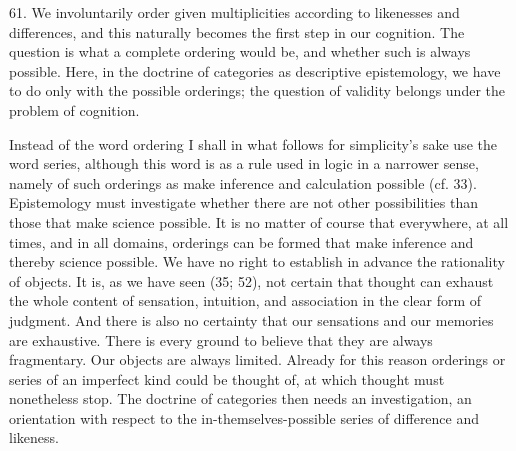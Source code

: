 \documentclass[12pt,a4paper]{book}
\newcommand{\opage}[1]{\marginnote{\footnotesize\textit{[#1]}}}
\begin{document}
61. We involuntarily order given multiplicities according to likenesses and
differences, and this naturally becomes the first step in our cognition. The
question is what a complete ordering would be, and whether such is always
possible. Here, in the doctrine of categories as descriptive epistemology,
we have to do only with the possible orderings; the question of validity
belongs under the problem of cognition.

Instead of the word ordering I shall in what follows for simplicity's sake
use the word series, although this word is as a rule used in logic in a
narrower sense, namely of such orderings as make inference and calculation
possible (cf. 33). Epistemology must investigate whether there are not other
possibilities than those that make science possible. It is no matter of
course that everywhere, at all times, and in all domains, orderings can be
formed that make inference and thereby science possible. We have no right to
establish in advance the rationality of objects. It is, as we have seen (35;
52), not certain that thought can exhaust the whole content of sensation,
intuition, and association in the clear form of judgment. And there is also
no certainty that our sensations and our memories are exhaustive. There is
every ground to believe that they are always fragmentary. Our \opage{163}objects are
always limited. Already for this reason orderings or series of an imperfect
kind could be thought of, at which thought must nonetheless stop. The
doctrine of categories then needs an investigation, an orientation with
respect to the in-themselves-possible series of difference and likeness.
\end{document}
